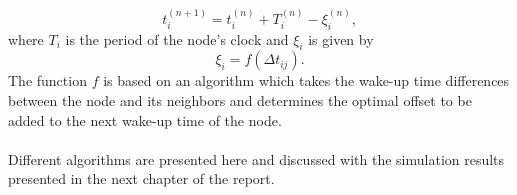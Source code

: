\documentclass[a4paper,10pt]{report}
\begin{document}
\begin{equation}
t_i^{(n+1)} = t_i^{(n)} + T_i^{(n)} - \xi_i^{(n)} ,
\end{equation}
where $T_i$ is the period of the node's clock and $\xi_i$ is given by
\begin{equation}
\xi_i = f(\Delta t_{ij}).
\end{equation}
The function $f$ is based on an algorithm which takes the wake-up time differences between the node and its neighbors and determines
the optimal offset to be added to the next wake-up time of the node.
\paragraph*{} Different algorithms are presented here and discussed with the simulation results presented in the next chapter of the report.
\end{document}
